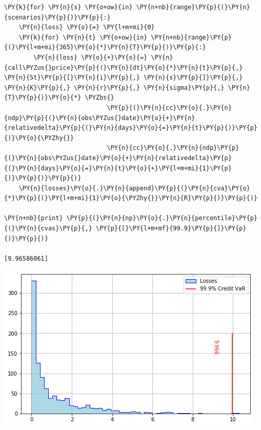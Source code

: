\begin{Answer}
\begin{tcolorbox}[size=fbox, boxrule=1pt, colback=cellbackground, colframe=cellborder]
\begin{Verbatim}[commandchars=\\\{\}]
\PY{k}{for} \PY{n}{s} \PY{o+ow}{in} \PY{n+nb}{range}\PY{p}{(}\PY{n}{scenarios}\PY{p}{)}\PY{p}{:}
    \PY{n}{loss} \PY{o}{=} \PY{l+m+mi}{0}
    \PY{k}{for} \PY{n}{t} \PY{o+ow}{in} \PY{n+nb}{range}\PY{p}{(}\PY{l+m+mi}{365}\PY{o}{*}\PY{n}{T}\PY{p}{)}\PY{p}{:} 
        \PY{n}{loss} \PY{o}{+}\PY{o}{=} \PY{n}{call\PYZus{}price}\PY{p}{(}\PY{n}{dt}\PY{o}{*}\PY{n}{t}\PY{p}{,} \PY{n}{St}\PY{p}{[}\PY{n}{i}\PY{p}{,} \PY{n}{s}\PY{p}{]}\PY{p}{,} \PY{n}{K}\PY{p}{,} \PY{n}{r}\PY{p}{,} \PY{n}{sigma}\PY{p}{,} \PY{n}{T}\PY{p}{)}\PY{o}{*} \PYZbs{}
                            \PY{p}{(}\PY{n}{cc}\PY{o}{.}\PY{n}{ndp}\PY{p}{(}\PY{n}{obs\PYZus{}date}\PY{o}{+}\PY{n}{relativedelta}\PY{p}{(}\PY{n}{days}\PY{o}{=}\PY{n}{t}\PY{p}{)}\PY{p}{)}\PY{o}{\PYZhy{}}
                            \PY{n}{cc}\PY{o}{.}\PY{n}{ndp}\PY{p}{(}\PY{n}{obs\PYZus{}date}\PY{o}{+}\PY{n}{relativedelta}\PY{p}{(}\PY{n}{days}\PY{o}{=}\PY{n}{t}\PY{o}{+}\PY{l+m+mi}{1}\PY{p}{)}\PY{p}{)}\PY{p}{)}        
    \PY{n}{losses}\PY{o}{.}\PY{n}{append}\PY{p}{(}\PY{n}{cva}\PY{o}{*}\PY{p}{(}\PY{l+m+mi}{1}\PY{o}{\PYZhy{}}\PY{n}{R}\PY{p}{)}\PY{p}{)}
		
\PY{n+nb}{print} \PY{p}{(}\PY{n}{np}\PY{o}{.}\PY{n}{percentile}\PY{p}{(}\PY{n}{cvas}\PY{p}{,} \PY{p}{[}\PY{l+m+mf}{99.9}\PY{p}{]}\PY{p}{)}\PY{p}{)}

[9.96586061]
\end{Verbatim}
\end{tcolorbox}

\includegraphics{figures/cr_var_ex}
\end{Answer}





